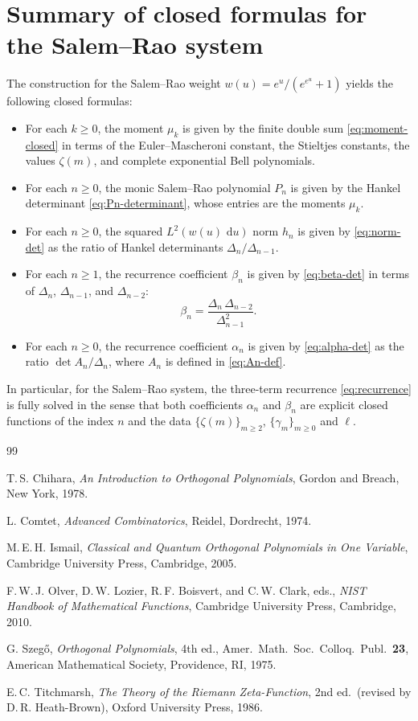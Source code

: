 \documentclass[11pt]{amsart}
\numberwithin{equation}{section}
\theoremstyle{definition}
\newcommand{\dd}{\,\mathrm{d}}
\newcommand{\mom}[1]{\mu_{#1}}
\newcommand{\DeltaH}[1]{\Delta_{#1}}
\begin{document}
\section{Summary of closed formulas for the Salem--Rao system}

The construction for the Salem--Rao weight $w(u)=e^{u}/(e^{e^{u}}+1)$ yields
the following closed formulas:

\begin{itemize}
\item For each $k\ge 0$, the moment $\mom{k}$ is given by the finite double sum
\eqref{eq:moment-closed} in terms of the Euler--Mascheroni constant, the
Stieltjes constants, the values $\zeta(m)$, and complete exponential Bell
polynomials.
\item For each $n\ge 0$, the monic Salem--Rao polynomial $P_{n}$ is given by
the Hankel determinant \eqref{eq:Pn-determinant}, whose entries are the
moments $\mom{k}$.
\item For each $n\ge 0$, the squared $L^{2}(w(u)\,\dd u)$ norm $h_{n}$ is
given by \eqref{eq:norm-det} as the ratio of Hankel determinants
$\DeltaH{n}/\DeltaH{n-1}$.
\item For each $n\ge 1$, the recurrence coefficient $\beta_{n}$ is given by
\eqref{eq:beta-det} in terms of $\DeltaH{n}$, $\DeltaH{n-1}$, and
$\DeltaH{n-2}$:
\[
\beta_{n}=\frac{\DeltaH{n}\,\DeltaH{n-2}}{\DeltaH{n-1}^{2}}.
\]
\item For each $n\ge 0$, the recurrence coefficient $\alpha_{n}$ is given by
\eqref{eq:alpha-det} as the ratio $\det A_{n}/\DeltaH{n}$, where $A_{n}$ is
defined in \eqref{eq:An-def}.
\end{itemize}

In particular, for the Salem--Rao system, the three-term recurrence
\eqref{eq:recurrence} is fully solved in the sense that both coefficients
$\alpha_{n}$ and $\beta_{n}$ are explicit closed functions of the index $n$
and the data $\{\zeta(m)\}_{m\ge 2}$, $\{\gamma_{m}\}_{m\ge 0}$ and $\ell$.

\begin{thebibliography}{99}

T.\,S. Chihara,
\emph{An Introduction to Orthogonal Polynomials},
Gordon and Breach, New York, 1978.

L. Comtet,
\emph{Advanced Combinatorics},
Reidel, Dordrecht, 1974.

M.\,E.\,H. Ismail,
\emph{Classical and Quantum Orthogonal Polynomials in One Variable},
Cambridge University Press, Cambridge, 2005.

F.\,W.\,J. Olver, D.\,W. Lozier, R.\,F. Boisvert, and C.\,W. Clark, eds.,
\emph{NIST Handbook of Mathematical Functions},
Cambridge University Press, Cambridge, 2010.

G. Szeg\H{o},
\emph{Orthogonal Polynomials},
4th ed., Amer.\ Math.\ Soc.\ Colloq.\ Publ.\ \textbf{23},
American Mathematical Society, Providence, RI, 1975.

E.\,C. Titchmarsh,
\emph{The Theory of the Riemann Zeta-Function},
2nd ed.\ (revised by D.\,R. Heath-Brown),
Oxford University Press, 1986.

\end{thebibliography}
\end{document}

